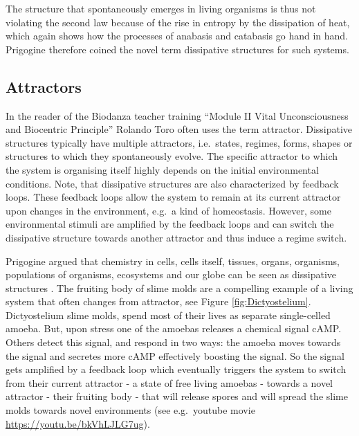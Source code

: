 \documentclass[
  11pt,
]{book}
\begin{document}
The structure that spontaneously emerges in living organisms is thus not violating the second law because of the rise in entropy by the dissipation of heat, which again shows how the processes of anabasis and catabasis go hand in hand.
Prigogine therefore coined the novel term dissipative structures for such systems.

\hypertarget{attractors}{%
\subsection{Attractors}\label{attractors}}

In the reader of the Biodanza teacher training ``Module II Vital Unconsciousness and Biocentric Principle'' Rolando Toro often uses the term attractor. Dissipative structures typically have multiple attractors, i.e.~states, regimes, forms, shapes or structures to which they spontaneously evolve. The specific attractor to which the system is organising itself highly depends on the initial environmental conditions.
Note, that dissipative structures are also characterized by feedback loops.
These feedback loops allow the system to remain at its current attractor upon changes in the environment, e.g.~a kind of homeostasis.
However, some environmental stimuli are amplified by the feedback loops and can switch the dissipative structure towards another attractor and thus induce a regime switch.

Prigogine argued that chemistry in cells, cells itself, tissues, organs, organisms, populations of organisms, ecosystems and our globe can be seen as dissipative structures \citep{prigogineStengers1984}.
The fruiting body of slime molds are a compelling example of a living system that often changes from attractor, see Figure \ref{fig:Dictyostelium}. Dictyostelium slime molds, spend most of their lives as separate single-celled amoeba. But, upon stress one of the amoebas releases a chemical signal cAMP. Others detect this signal, and respond in two ways: the amoeba moves towards the signal and secretes more cAMP effectively boosting the signal. So the signal gets amplified by a feedback loop which eventually triggers the system to switch from their current attractor - a state of free living amoebas - towards a novel attractor - their fruiting body - that will release spores and will spread the slime molds towards novel environments (see e.g.~youtube movie \url{https://youtu.be/bkVhLJLG7ug}).

\pagebreak
\end{document}
